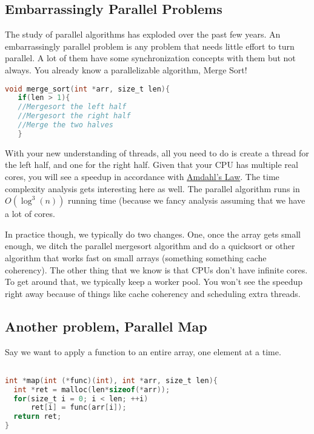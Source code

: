 \begin{aside}

\subsection{Embarrassingly Parallel Problems}\label{embarrassingly-parallel-problems}

The study of parallel algorithms has exploded over the past few years. An embarrassingly parallel problem is any problem that needs little effort to turn parallel. A lot of them have some synchronization concepts with them but not always. You already know a parallelizable algorithm, Merge Sort!

\begin{lstlisting}[language=C]
void merge_sort(int *arr, size_t len){
   if(len > 1){
   //Mergesort the left half
   //Mergesort the right half
   //Merge the two halves
   }
\end{lstlisting}

With your new understanding of threads, all you need to do is create a thread for the left half, and one for the right half. Given that your CPU has multiple real cores, you will see a speedup in accordance with \href{https://en.wikipedia.org/wiki/Amdahl's_law}{Amdahl's Law}. The time complexity analysis gets interesting here as well. The parallel algorithm runs in $O(\log^3(n))$ running time (because we fancy analysis assuming that we have a lot of cores.

In practice though, we typically do two changes. One, once the array gets small enough, we ditch the parallel mergesort algorithm and do a quicksort or other algorithm that works fast on small arrays (something something cache coherency). The other thing that we know is that CPUs don't have infinite cores. To get around that, we typically keep a worker pool. You won't see the speedup right away because of things like cache coherency and scheduling extra threads.

\subsection{Another problem, Parallel Map}\label{another-problem-parallel-map}

Say we want to apply a function to an entire array, one element at a time.

\begin{lstlisting}[language=C]

int *map(int (*func)(int), int *arr, size_t len){
  int *ret = malloc(len*sizeof(*arr));
  for(size_t i = 0; i < len; ++i) 
      ret[i] = func(arr[i]);
  return ret;
}
\end{lstlisting}


\end{aside}
